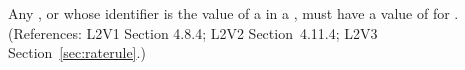 Any \Compartment, \Species or \Parameter whose identifier is the value of a
  in a \RateRule, must have a value of 
for .  (References: L2V1 Section 4.8.4; L2V2 Section~4.11.4;
L2V3 Section~\ref{sec:raterule}.)
